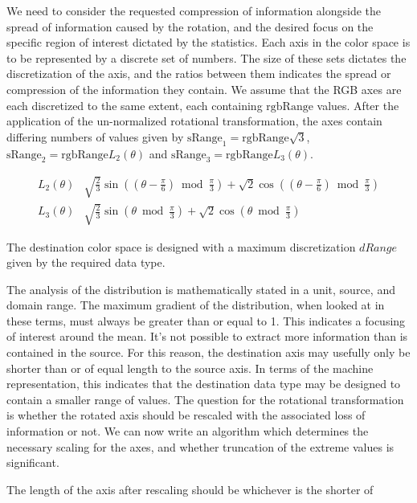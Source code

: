 We need to consider the requested compression of information alongside the spread of information caused by the rotation, and the desired focus on the specific region of interest dictated by the statistics. Each axis in the color space is to be represented by a discrete set of numbers. The size of these sets dictates the discretization of the axis, and the ratios between them indicates the spread or compression of the information they contain. We assume that the RGB axes are each discretized to the same extent, each containing $\text{rgbRange}$ values. After the application of the un-normalized rotational transformation, the axes contain differing numbers of values given by $\text{sRange}_1 =\text{rgbRange} \sqrt{3} $, $\text{sRange}_2 = \text{rgbRange} L_2(\theta) $  and $\text{sRange}_3 = \text{rgbRange} L_3(\theta)$.

\begin{align}\label{eq:L}
  L_2(\theta) & \sqrt{\frac{2}{3}} \sin \left(\left(\theta -\frac{\pi }{6}\right) \bmod \frac{\pi }{3}\right) + \sqrt{2} \cos \left(\left(\theta -\frac{\pi }{6}\right) \bmod \frac{\pi }{3}\right) \\
  L_3(\theta) & \sqrt{\frac{2}{3}} \sin \left(\theta  \bmod \frac{\pi }{3}\right) + \sqrt{2} \cos \left(\theta  \bmod \frac{\pi }{3}\right)
\end{align}

The destination color space is designed with a maximum discretization $dRange$ given by the required data type.

The analysis of the distribution is mathematically stated in a unit, source, and domain range. The maximum gradient of the distribution, when looked at in these terms, must always be greater than or equal to 1. This indicates a focusing of interest around the mean. It's not possible to extract more information than is contained in the source. For this reason, the destination axis may usefully only be shorter than or of equal length to the source axis. In terms of the machine representation, this indicates that the destination data type may be designed to contain a smaller range of values. The question for the rotational transformation is whether the rotated axis should be rescaled with the associated loss of information or not. We can now write an algorithm which determines the necessary scaling for the axes, and whether truncation of the extreme values is significant.

The length of the axis after rescaling should be whichever is the shorter of

